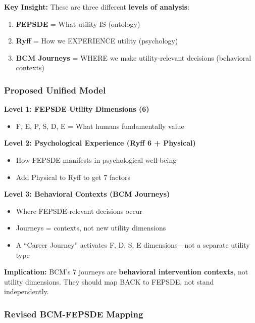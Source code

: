 \textbf{Key Insight:} These are three different \textbf{levels of analysis}:

\begin{enumerate}
\item \textbf{FEPSDE} = What utility IS (ontology)
\item \textbf{Ryff} = How we EXPERIENCE utility (psychology)
\item \textbf{BCM Journeys} = WHERE we make utility-relevant decisions (behavioral contexts)
\end{enumerate}

\subsubsection{Proposed Unified Model}

\begin{tcolorbox}[colback=blue!5!white, colframe=blue!75!black, title=Unified Framework: FEPSDE as Foundation]

\textbf{Level 1: FEPSDE Utility Dimensions (6)}
\begin{itemize}[nosep]
\item F, E, P, S, D, E = What humans fundamentally value
\end{itemize}

\textbf{Level 2: Psychological Experience (Ryff 6 + Physical)}
\begin{itemize}[nosep]
\item How FEPSDE manifests in psychological well-being
\item Add Physical to Ryff to get 7 factors
\end{itemize}

\textbf{Level 3: Behavioral Contexts (BCM Journeys)}
\begin{itemize}[nosep]
\item Where FEPSDE-relevant decisions occur
\item Journeys = contexts, not new utility dimensions
\item A ``Career Journey'' activates F, D, S, E dimensions---not a separate utility type
\end{itemize}

\textbf{Implication:} BCM's 7 journeys are \textbf{behavioral intervention contexts}, not utility dimensions. They should map BACK to FEPSDE, not stand independently.

\end{tcolorbox}

\subsubsection{Revised BCM-FEPSDE Mapping}


